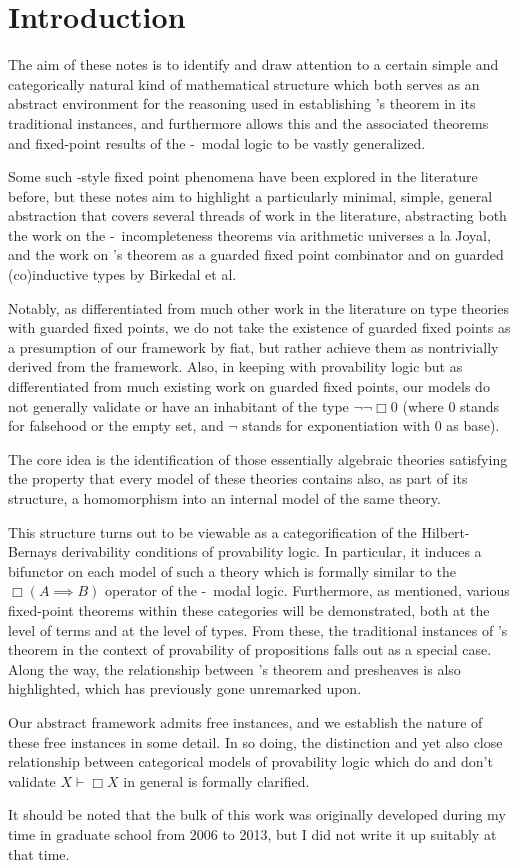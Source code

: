 \documentclass[./main.tex]{subfiles}
\begin{document}
\section{Introduction}
The aim of these notes is to identify and draw attention to a certain simple and categorically natural kind of mathematical structure which both serves as an abstract environment for the reasoning used in establishing \Loeb's theorem in its traditional instances, and furthermore allows this and the associated theorems and fixed-point results of the \Goedel-\Loeb\ modal logic to be vastly generalized.

Some such \Loeb-style fixed point phenomena have been explored in the literature before, but these notes aim to highlight a particularly minimal, simple, general abstraction that covers several threads of work in the literature, abstracting both the work on the \Goedel-\Loeb\ incompleteness theorems via arithmetic universes a la Joyal, and the work on \Loeb's theorem as a guarded fixed point combinator and on guarded (co)inductive types by Birkedal et al.

Notably, as differentiated from much other work in the literature on type theories with guarded fixed points, we do not take the existence of guarded fixed points as a presumption of our framework by fiat, but rather achieve them as nontrivially derived from the framework. Also, in keeping with provability logic but as differentiated from much existing work on guarded fixed points, our models do not generally validate or have an inhabitant of the type $\neg \neg \Box 0$ (where $0$ stands for falsehood or the empty set, and $\neg$ stands for exponentiation with $0$ as base).

The core idea is the identification of those essentially algebraic theories satisfying the property that every model of these theories contains also, as part of its structure, a homomorphism into an internal model of the same theory.

This structure turns out to be viewable as a categorification of the Hilbert-Bernays derivability conditions of provability logic. In particular, it induces a bifunctor on each model of such a theory which is formally similar to the $\Box(A \implies B)$ operator of the \Goedel-\Loeb\ modal logic. Furthermore, as mentioned, various fixed-point theorems within these categories will be demonstrated, both at the level of terms and at the level of types. From these, the traditional instances of \Loeb's theorem in the context of provability of propositions falls out as a special case. Along the way, the relationship between \Loeb's theorem and presheaves is also highlighted, which has previously gone unremarked upon.

Our abstract framework admits free instances, and we establish the nature of these free instances in some detail. In so doing, the distinction and yet also close relationship between categorical models of provability logic which do and don't validate $X \vdash \Box X$ in general is formally clarified.

It should be noted that the bulk of this work was originally developed during my time in graduate school from 2006 to 2013, but I did not write it up suitably at that time.
\end{document}
